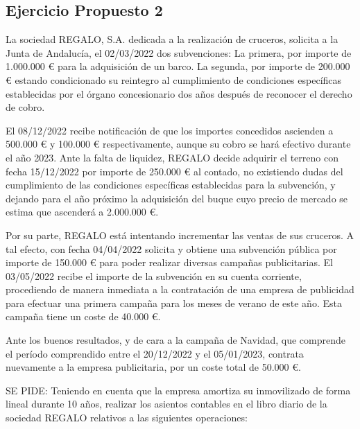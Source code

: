 \hypertarget{ejercicio-propuesto-2}{%
\subsection{Ejercicio Propuesto 2}\label{ejercicio-propuesto-2}}

La sociedad REGALO, S.A. dedicada a la realización de cruceros, solicita
a la Junta de Andalucía, el 02/03/2022 dos subvenciones: La primera, por
importe de 1.000.000 € para la adquisición de un barco. La segunda, por
importe de 200.000 € estando condicionado su reintegro al cumplimiento
de condiciones específicas establecidas por el órgano concesionario dos
años después de reconocer el derecho de cobro.

El 08/12/2022 recibe notificación de que los importes concedidos
ascienden a 500.000 € y 100.000 € respectivamente, aunque su cobro se
hará efectivo durante el año 2023. Ante la falta de liquidez, REGALO
decide adquirir el terreno con fecha 15/12/2022 por importe de 250.000 €
al contado, no existiendo dudas del cumplimiento de las condiciones
específicas establecidas para la subvención, y dejando para el año
próximo la adquisición del buque cuyo precio de mercado se estima que
ascenderá a 2.000.000 €.

Por su parte, REGALO está intentando incrementar las ventas de sus
cruceros. A tal efecto, con fecha 04/04/2022 solicita y obtiene una
subvención pública por importe de 150.000 € para poder realizar diversas
campañas publicitarias. El 03/05/2022 recibe el importe de la subvención
en su cuenta corriente, procediendo de manera inmediata a la
contratación de una empresa de publicidad para efectuar una primera
campaña para los meses de verano de este año. Esta campaña tiene un
coste de 40.000 €.

Ante los buenos resultados, y de cara a la campaña de Navidad, que
comprende el período comprendido entre el 20/12/2022 y el 05/01/2023,
contrata nuevamente a la empresa publicitaria, por un coste total de
50.000 €.

SE PIDE: Teniendo en cuenta que la empresa amortiza su inmovilizado de
forma lineal durante 10 años, realizar los asientos contables en el
libro diario de la sociedad REGALO relativos a las siguientes
operaciones:

